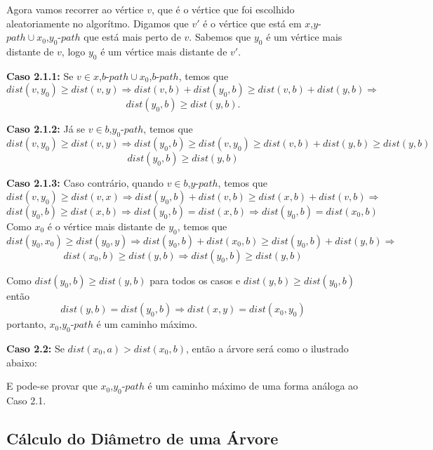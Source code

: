 \documentclass[a4paper,12pt]{article}
\begin{document}
\begin{itemize}
			Agora vamos recorrer ao vértice $v$, que é o vértice
			que foi escolhido aleatoriamente no algorítmo.
			Digamos que $v'$ é o vértice que está em
			$x$,$y$-$path\cup x_0$,$y_0$-$path$ que está mais
			perto de $v$.
			Sabemos que $y_0$ é um vértice mais distante de $v$,
			logo $y_0$ é um vértice mais distante de $v'$. 
			
			\textbf{Caso 2.1.1:} Se 
			$v\in x$,$b$-$path\cup x_0$,$b$-$path$, temos que
			$$ dist(v,y_0)\ge dist(v,y) \Rightarrow
			dist(v,b)+dist(y_0,b)\ge dist(v,b) + dist(y,b) 
			\Rightarrow$$
			$$ dist(y_0,b)\ge dist(y,b).$$

			\textbf{Caso 2.1.2:} Já se $v\in b$,$y_0$-$path$, 
			temos que
			$$ dist(v,y_0)\ge dist(v,y) \Rightarrow
			dist(y_0,b)\ge dist(v,y_0)\ge 
			dist(v,b) + dist(y,b)\ge dist(y,b) $$
			$$ dist(y_0,b)\ge dist(y,b) $$

			\textbf{Caso 2.1.3:} Caso contrário, quando 
			$v\in b$,$y$-$path$, temos que
			$$ dist(v,y_0)\ge dist(v,x) \Rightarrow
			dist(y_0,b)+dist(v,b)\ge dist(x,b)+dist(v,b)
			\Rightarrow $$
			$$ dist(y_0,b)\ge dist(x,b) \Rightarrow
			dist(y_0,b) = dist(x,b) \Rightarrow 
			dist(y_0,b) = dist(x_0,b) $$
			Como  $x_0$ é o vértice mais distante de $y_0$, temos
			que
			$$ dist(y_0,x_0)\ge dist(y_0,y) \Rightarrow
			dist(y_0,b) + dist(x_0,b)\ge dist(y_0,b) + dist(y,b)
			\Rightarrow $$
			$$ dist(x_0,b)\ge dist(y,b) \Rightarrow 
			dist(y_0,b)\ge dist(y,b) $$

			\bigskip

			Como $dist(y_0,b)\ge dist(y,b)$ para todos os casos
			e $dist(y,b)\ge dist(y_0,b)$ então
			$$ dist(y,b) =  dist(y_0,b) \Rightarrow
			dist(x,y) = dist(x_0,y_0) $$
			portanto, $x_0$,$y_0$-$path$ é um caminho máximo.

			\bigskip
			\bigskip

			\textbf{Caso 2.2:} Se $dist(x_0,a)> dist(x_0,b)$,
			então a árvore será como o ilustrado abaixo:


			E pode-se provar que $x_0$,$y_0$-$path$ é um caminho
			máximo de uma forma análoga ao Caso 2.1.


			

        \end{itemize}

    	\newpage



        
    \subsection{Cálculo do Diâmetro de uma Árvore}
    


\newpage
    
    
    
\end{document}
